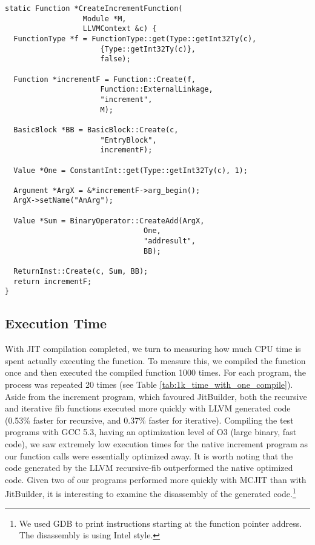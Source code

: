 \begin{lstlisting}[float,floatplacement=H,
  caption={Generating MCJIT IR for the increment program.},
  label=lst:llvm_increment]
static Function *CreateIncrementFunction(
                  Module *M, 
                  LLVMContext &c) {
  FunctionType *f = FunctionType::get(Type::getInt32Ty(c), 
                      {Type::getInt32Ty(c)}, 
                      false);
  
  Function *incrementF = Function::Create(f, 
                      Function::ExternalLinkage, 
                      "increment", 
                      M);

  BasicBlock *BB = BasicBlock::Create(c, 
                      "EntryBlock", 
                      incrementF);
  
  Value *One = ConstantInt::get(Type::getInt32Ty(c), 1);
  
  Argument *ArgX = &*incrementF->arg_begin(); 
  ArgX->setName("AnArg");

  Value *Sum = BinaryOperator::CreateAdd(ArgX, 
                                One,
                                "addresult", 
                                BB);

  ReturnInst::Create(c, Sum, BB);
  return incrementF;
}
\end{lstlisting}

\subsection{Execution Time}
With JIT compilation completed, we turn to measuring how much CPU time is spent actually executing the function.
To measure this, we compiled the function once and then executed the compiled function 1000 times.
For each program, the process was repeated 20 times (see Table \ref{tab:1k_time_with_one_compile}).
Aside from the increment program, which favoured JitBuilder, both the recursive and iterative fib functions executed more quickly with LLVM generated code (0.53\% faster for recursive, and 0.37\% faster for iterative).
Compiling the test programs with GCC 5.3, having an optimization level of O3 (large binary, fast code), we saw extremely low execution times for the native increment program as our function calls were essentially optimized away.
It is worth noting that the code generated by the LLVM recursive-fib outperformed the native optimized code.
Given two of our programs performed more quickly with MCJIT than with JitBuilder, it is interesting to examine the disassembly of the generated code.\footnote{We used GDB to print instructions starting at the function pointer address. The disassembly is using Intel style.}

